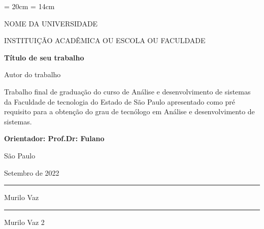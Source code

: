 \documentclass[12pt,a4paper]{book}
\begin{document}
\begin{titlepage}

\addtolength{\topmargin}{1.5cm}

\textheight = 20cm
\textwidth = 14cm

\setlength{\baselineskip}{1.4\baselineskip}
\begin{center}

{\large NOME DA UNIVERSIDADE}

{\large INSTITUIÇÃO ACADÊMICA OU ESCOLA OU FACULDADE}
\end{center}

\vspace{2cm}
\begin{center}
{\Large\textbf{Título de seu trabalho } }
\end{center}

\vspace{1.5cm}

\begin{center}
{\Large Autor do trabalho}
\end{center}

\vspace{2cm}
\begin{flushright}
\begin{minipage}{10cm}
\hrulefill

Trabalho final de graduação do curso de Análise e desenvolvimento de sistemas da Faculdade de tecnologia
do Estado de São Paulo apresentado como pré requisito para a obtenção do grau de tecnólogo em Análise e
desenvolvimento de sistemas.

\hrulefill

{\textbf{Orientador: Prof.Dr: Fulano}}
\end{minipage}
\end{flushright}
\setlength{\baselineskip}{0.7\baselineskip}
\vfill

\begin{center}
São Paulo

Setembro de 2022
\end{center}

\end{titlepage}

\newpage
\begin{center}
\rule {10cm}{0,01cm}

Murilo Vaz

\vspace{10cm}

\rule {10cm}{0,01cm}

Murilo Vaz 2
\end{center}
\end{document}
